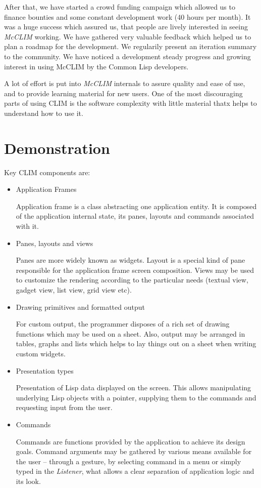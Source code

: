 \documentclass{sig-alternate-05-2015}
\begin{document}
After that, we have started a crowd funding campaign which allowed us
to finance bounties and some constant development work (40 hours per
month). It was a huge success which assured us, that people are lively
interested in seeing \emph{McCLIM} working. We have gathered very
valuable feedback which helped us to plan a roadmap\cite{roadmap} for
the development. We regularily present an iteration summary to the
community. We have noticed a development steady progress and growing
interest in using McCLIM by the Common Lisp developers.

A lot of effort is put into \emph{McCLIM} internals to assure quality
and ease of use, and to provide learning material for new users. One
of the most discouraging parts of using CLIM is the software
complexity with little material\cite{guided} thatx helps to understand
how to use it.
\section{Demonstration}

Key CLIM components are:

\begin{itemize}
\item Application Frames

  Application frame is a class abstracting one application entity. It
  is composed of the application internal state, its panes, layouts
  and commands associated with it.

\item Panes, layouts and views

  Panes are more widely known as widgets. Layout is a special kind of
  pane responsible for the application frame screen composition. Views
  may be used to customize the rendering according to the particular
  needs (textual view, gadget view, list view, grid view etc).

\item Drawing primitives and formatted output

  For custom output, the programmer disposes of a rich set of drawing
  functions which may be used on a sheet. Also, output may be arranged
  in tables, graphs and lists which helps to lay things out on a sheet
  when writing custom widgets.

\item Presentation types

  Presentation of Lisp data displayed on the screen. This allows
  manipulating underlying Lisp objects with a pointer, supplying them
  to the commands and requesting input from the user.

\item Commands

  Commands are functions provided by the application to achieve its
  design goals. Command arguments may be gathered by various means
  available for the user – through a gesture, by selecting command in
  a menu or simply typed in the \emph{Listener}\cite{listener}, what
  allows a clear separation of application logic and its look.
\end{itemize}
\end{document}
